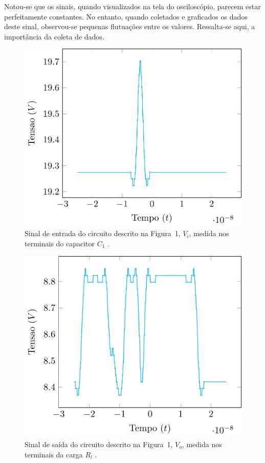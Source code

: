 \documentclass[12pt,a4paper]{article}
\begin{document}
Notou-se que os sinais, quando visualizados na tela do osciloscópio, parecem estar perfeitamente constantes. No entanto, quando coletados e graficados os dados deste sinal,  observou-se pequenas flutuações entre os valores. Ressalta-se aqui, a importância da coleta de dados.

\begin{figure}[htpb]
  \centering
  \includegraphics[width=0.8\linewidth]{./exp1/entrada_exp1.pdf}
  \caption{Sinal de entrada do circuito descrito na Figura~1, $V_{i}$, medida nos terminais do capacitor $C_1$ .}
  \label{entrada_exp1}
\end{figure}
\begin{figure}[htpb]
  \centering
  \includegraphics[width=0.8\linewidth]{./exp1/saida_exp1.pdf}

  \caption{Sinal de saída do circuito descrito na Figura~1, $V_{o}$, medida nos terminais da carga $R_l$ .}
  \label{saida_exp1}
\end{figure}
\end{document}
